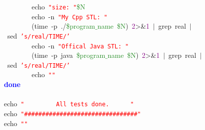 \mbox{}\ \ \ \ \ \ \ \ echo\ \texttt{\textcolor{Red}{"{}size:\ "{}}}\textcolor{ForestGreen}{\$N} \\
\mbox{}\ \ \ \ \ \ \ \ echo\ -n\ \texttt{\textcolor{Red}{"{}My\ Cpp\ STL:\ "{}}} \\
\mbox{}\ \ \ \ \ \ \ \ \textcolor{BrickRed}{(}time\ -p\ \textcolor{BrickRed}{./}\textcolor{ForestGreen}{\$program$\_$name}\ \textcolor{ForestGreen}{\$N}\textcolor{BrickRed}{)}\ \textcolor{Purple}{2}\textcolor{BrickRed}{\textgreater{}\&}\textcolor{Purple}{1}\ \textcolor{BrickRed}{$|$}\ grep\ real\ \textcolor{BrickRed}{$|$}\ sed\ \texttt{\textcolor{Red}{'s/real/TIME/'}} \\
\mbox{}\ \ \ \ \ \ \ \ echo\ -n\ \texttt{\textcolor{Red}{"{}Offical\ Java\ STL:\ "{}}} \\
\mbox{}\ \ \ \ \ \ \ \ \textcolor{BrickRed}{(}time\ -p\ java\ \textcolor{ForestGreen}{\$program$\_$name}\ \textcolor{ForestGreen}{\$N}\textcolor{BrickRed}{)}\ \textcolor{Purple}{2}\textcolor{BrickRed}{\textgreater{}\&}\textcolor{Purple}{1}\ \textcolor{BrickRed}{$|$}\ grep\ real\ \textcolor{BrickRed}{$|$}\ sed\ \texttt{\textcolor{Red}{'s/real/TIME/'}} \\
\mbox{}\ \ \ \ \ \ \ \ echo\ \texttt{\textcolor{Red}{"{}"{}}} \\
\mbox{}\textbf{\textcolor{Blue}{done}} \\
\mbox{} \\
\mbox{}echo\ \texttt{\textcolor{Red}{"{}\ \ \ \ \ \ \ \ \ All\ tests\ done.\ \ \ \ \ \ "{}}} \\
\mbox{}echo\ \texttt{\textcolor{Red}{"{}\#\#\#\#\#\#\#\#\#\#\#\#\#\#\#\#\#\#\#\#\#\#\#\#\#\#\#\#\#\#\#\#"{}}} \\
\mbox{}echo\ \texttt{\textcolor{Red}{"{}"{}}} \\
\mbox{}
